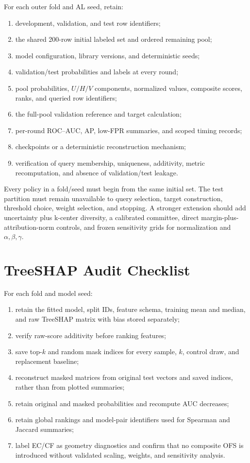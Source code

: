 For each outer fold and AL seed, retain:

\begin{enumerate}
    \item development, validation, and test row identifiers;
    \item the shared 200-row initial labeled set and ordered remaining pool;
    \item model configuration, library versions, and deterministic seeds;
    \item validation/test probabilities and labels at every round;
    \item pool probabilities, $U/H/V$ components, normalized values, composite
    scores, ranks, and queried row identifiers;
    \item the full-pool validation reference and target calculation;
    \item per-round ROC--AUC, AP, low-FPR summaries, and scoped timing records;
    \item checkpoints or a deterministic reconstruction mechanism;
    \item verification of query membership, uniqueness, additivity, metric
    recomputation, and absence of validation/test leakage.
\end{enumerate}

Every policy in a fold/seed must begin from the same initial set. The test
partition must remain unavailable to query selection, target construction,
threshold choice, weight selection, and stopping. A stronger extension should
add uncertainty plus k-center diversity, a calibrated committee, direct
margin-plus-attribution-norm controls, and frozen sensitivity grids for
normalization and $\alpha,\beta,\gamma$.

\section{TreeSHAP Audit Checklist}
\label{app:fidelity}

For each fold and model seed:

\begin{enumerate}
    \item retain the fitted model, split IDs, feature schema, training mean and
    median, and raw TreeSHAP matrix with bias stored separately;
    \item verify raw-score additivity before ranking features;
    \item save top-$k$ and random mask indices for every sample, $k$, control
    draw, and replacement baseline;
    \item reconstruct masked matrices from original test vectors and saved
    indices, rather than from plotted summaries;
    \item retain original and masked probabilities and recompute AUC decreases;
    \item retain global rankings and model-pair identifiers used for Spearman and
    Jaccard summaries;
    \item label EC/CF as geometry diagnostics and confirm that no composite OFS
    is introduced without validated scaling, weights, and sensitivity analysis.
\end{enumerate}

